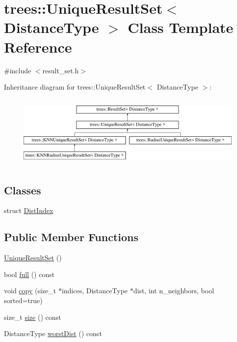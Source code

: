 \hypertarget{classtrees_1_1_unique_result_set}{}\section{trees\+:\+:Unique\+Result\+Set$<$ Distance\+Type $>$ Class Template Reference}
\label{classtrees_1_1_unique_result_set}


{\ttfamily \#include $<$result\+\_\+set.\+h$>$}

Inheritance diagram for trees\+:\+:Unique\+Result\+Set$<$ Distance\+Type $>$\+:\begin{figure}[H]
\begin{center}
\leavevmode
\includegraphics[height=3.624595cm]{classtrees_1_1_unique_result_set}
\end{center}
\end{figure}
\subsection*{Classes}
\begin{DoxyCompactItemize}
\item 
struct \hyperlink{structtrees_1_1_unique_result_set_1_1_dist_index}{Dist\+Index}
\end{DoxyCompactItemize}
\subsection*{Public Member Functions}
\begin{DoxyCompactItemize}
\item 
\hyperlink{classtrees_1_1_unique_result_set_ad1f538e2dcaa431612d537efefc6699e}{Unique\+Result\+Set} ()
\item 
bool \hyperlink{classtrees_1_1_unique_result_set_a6c10f8635c22eaecaa7e6fda3afea132}{full} () const
\item 
void \hyperlink{classtrees_1_1_unique_result_set_a81ab4a644430e524c37a1024628c6b02}{copy} (size\+\_\+t $\ast$indices, Distance\+Type $\ast$dist, int n\+\_\+neighbors, bool sorted=true)
\item 
size\+\_\+t \hyperlink{classtrees_1_1_unique_result_set_a3b0df0041064e4e255e8cc22d142eab8}{size} () const
\item 
Distance\+Type \hyperlink{classtrees_1_1_unique_result_set_a2301eba6dae87959cc50668dd2307d4d}{worst\+Dist} () const
\end{DoxyCompactItemize}
